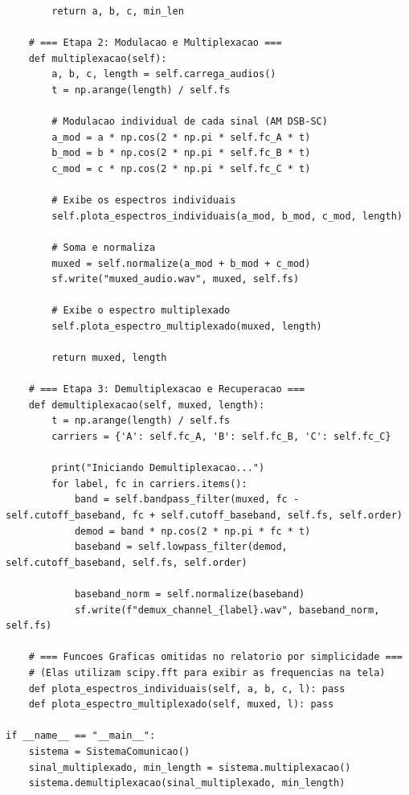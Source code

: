 \documentclass[12pt,a4paper]{article}
\begin{document}
\begin{lstlisting}
        return a, b, c, min_len

    # === Etapa 2: Modulacao e Multiplexacao ===
    def multiplexacao(self):
        a, b, c, length = self.carrega_audios()
        t = np.arange(length) / self.fs

        # Modulacao individual de cada sinal (AM DSB-SC)
        a_mod = a * np.cos(2 * np.pi * self.fc_A * t)
        b_mod = b * np.cos(2 * np.pi * self.fc_B * t)
        c_mod = c * np.cos(2 * np.pi * self.fc_C * t)

        # Exibe os espectros individuais
        self.plota_espectros_individuais(a_mod, b_mod, c_mod, length)

        # Soma e normaliza
        muxed = self.normalize(a_mod + b_mod + c_mod)
        sf.write("muxed_audio.wav", muxed, self.fs)
        
        # Exibe o espectro multiplexado
        self.plota_espectro_multiplexado(muxed, length)

        return muxed, length

    # === Etapa 3: Demultiplexacao e Recuperacao ===
    def demultiplexacao(self, muxed, length):
        t = np.arange(length) / self.fs
        carriers = {'A': self.fc_A, 'B': self.fc_B, 'C': self.fc_C}

        print("Iniciando Demultiplexacao...")
        for label, fc in carriers.items():
            band = self.bandpass_filter(muxed, fc - self.cutoff_baseband, fc + self.cutoff_baseband, self.fs, self.order)
            demod = band * np.cos(2 * np.pi * fc * t)
            baseband = self.lowpass_filter(demod, self.cutoff_baseband, self.fs, self.order)
            
            baseband_norm = self.normalize(baseband)
            sf.write(f"demux_channel_{label}.wav", baseband_norm, self.fs)

    # === Funcoes Graficas omitidas no relatorio por simplicidade ===
    # (Elas utilizam scipy.fft para exibir as frequencias na tela)
    def plota_espectros_individuais(self, a, b, c, l): pass
    def plota_espectro_multiplexado(self, muxed, l): pass

if __name__ == "__main__":
    sistema = SistemaComunicao()
    sinal_multiplexado, min_length = sistema.multiplexacao()
    sistema.demultiplexacao(sinal_multiplexado, min_length)
\end{lstlisting}
\end{document}
